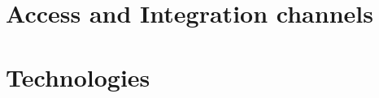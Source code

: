 \documentclass[hidelinks,a4paper,12pt]{article}
\begin{document}
	\section{Access and Integration channels}%
	\section{Technologies}%
	
	
	
	
	
	
\end{document}
